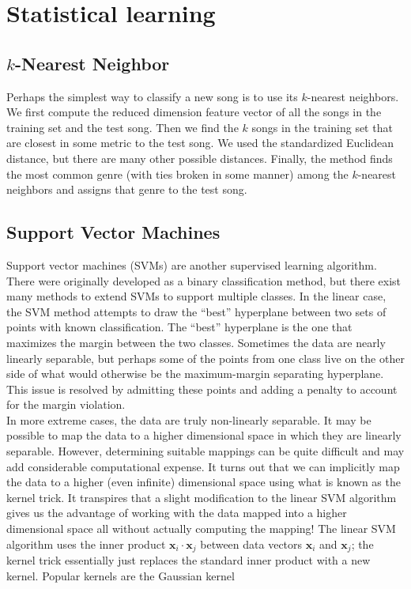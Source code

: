 \documentclass[12pt]{article}
\begin{document}
\section{Statistical learning}
\subsection{$k$-Nearest Neighbor}
Perhaps the simplest way to classify a new song is to use its $k$-nearest neighbors.  We first compute the reduced dimension feature vector of all the songs in the training set and the test song.  Then we find the $k$ songs in the training set that are closest in some metric to the test song.  We used the standardized Euclidean distance, but there are many other possible distances.  Finally, the method finds the most common genre (with ties broken in some manner) among the $k$-nearest neighbors and assigns that genre to the test song.\\

\subsection{Support Vector Machines}
Support vector machines (SVMs) are another supervised learning algorithm.  There were originally developed as a binary classification method, but there exist many methods to extend SVMs to support multiple classes.  In the linear case, the SVM method attempts to draw the ``best'' hyperplane between two sets of points with known classification.  The ``best'' hyperplane is the one that maximizes the margin between the two classes.  Sometimes the data are nearly linearly separable, but perhaps some of the points from one class live on the other side of what would otherwise be the maximum-margin separating hyperplane.  This issue is resolved by admitting these points and adding a penalty to account for the margin violation.\\

In more extreme cases, the data are truly non-linearly separable.  It may be possible to map the data to a higher dimensional space in which they are linearly separable.  However, determining suitable mappings can be quite difficult and may add considerable computational expense.  It turns out that we can implicitly map the data to a higher (even infinite) dimensional space using what is known as the kernel trick.  It transpires that a slight modification to the linear SVM algorithm gives us the advantage of working with the data mapped into a higher dimensional space all without actually computing the mapping!  The linear SVM algorithm uses the inner product $\mathbf{x}_i\cdot\mathbf{x}_j$ between data vectors $\mathbf{x}_i$ and $\mathbf{x}_j$; the kernel trick essentially just replaces the standard inner product with a new kernel.  Popular kernels are the Gaussian kernel
\end{document}

